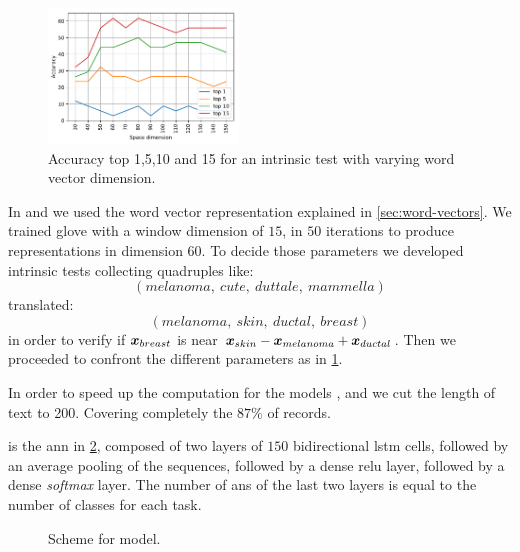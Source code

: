 \begin{figure}
  \centering
  \includegraphics[width=0.45\textwidth]{img/gloveParameter.pdf}
  \caption{Accuracy top 1,5,10 and 15 for an intrinsic test with
    varying word vector dimension.}
  \label{fig:gloveParameter}
\end{figure}
In \lstmb{} and \lstmc{} we used the word vector representation
explained in \cref{sec:word-vectors}. We trained \ac{glove} with a window dimension of $15$,
in $50$ iterations to produce representations in dimension $60$. To
decide those parameters we developed intrinsic tests collecting
quadruples like:
$$
(melanoma,\ cute,\ duttale,\ mammella)
$$
translated:
$$
(melanoma,\ skin,\ ductal,\ breast)
$$
in order to verify if $\bm{x}_{breast}$ is near
$\bm{x}_{skin}-\bm{x}_{melanoma}+\bm{x}_{ductal}$. Then we
proceeded to confront the different parameters as in
\cref{fig:gloveParameter}.

In order to speed up the computation for the models \lstmng{}, \lstmb{}
and \lstmc{} we cut the length of text to 200. Covering completely the
$87\%$ of records.

\lstmng{} is the \ac{ann} in \cref{fig:schemeLstmng},
composed of two layers of $150$ bidirectional \ac{lstm} cells,
followed by an average pooling of the sequences, followed by a
dense \ac{relu} layer, followed by a dense \emph{softmax} layer.
The number of \acp{an} of the last two layers is
equal to the number of classes for each task.
\begin{figure}
  \centering
  \caption{Scheme for \lstmng{} model.}
  \label{fig:schemeLstmng}
\end{figure}


